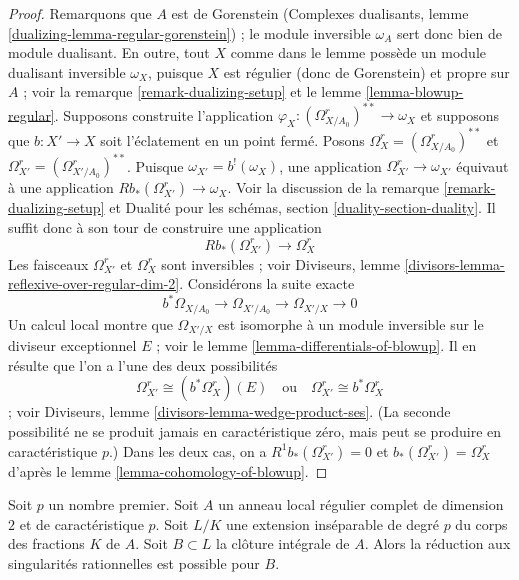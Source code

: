 \begin{proof} Remarquons que $A$ est de Gorenstein (Complexes dualisants, lemme \ref{dualizing-lemma-regular-gorenstein}) ; le module inversible $\omega_A$ sert donc bien de module dualisant. En outre, tout $X$ comme dans le lemme possède un module dualisant inversible $\omega_X$, puisque $X$ est régulier (donc de Gorenstein) et propre sur $A$ ; voir la remarque \ref{remark-dualizing-setup} et le lemme \ref{lemma-blowup-regular}. Supposons construite l'application $\varphi_X : (\Omega^r_{X/A_0})^{**} \to \omega_X$ et supposons que $b : X' \to X$ soit l'éclatement en un point fermé. Posons $\Omega^r_X = (\Omega^r_{X/A_0})^{**}$ et $\Omega^r_{X'} = (\Omega^r_{X'/A_0})^{**}$. Puisque $\omega_{X'} = b^!(\omega_X)$, une application $\Omega^r_{X'} \to \omega_{X'}$ équivaut à une application $Rb_*(\Omega^r_{X'}) \to \omega_X$. Voir la discussion de la remarque \ref{remark-dualizing-setup} et Dualité pour les schémas, section \ref{duality-section-duality}. Il suffit donc à son tour de construire une application $$
Rb_*(\Omega^r_{X'}) \longrightarrow \Omega^r_X
$$ Les faisceaux $\Omega^r_{X'}$ et $\Omega^r_X$ sont inversibles ; voir Diviseurs, lemme \ref{divisors-lemma-reflexive-over-regular-dim-2}. Considérons la suite exacte $$
b^*\Omega_{X/A_0} \to \Omega_{X'/A_0} \to \Omega_{X'/X} \to 0
$$ Un calcul local montre que $\Omega_{X'/X}$ est isomorphe à un module inversible sur le diviseur exceptionnel $E$ ; voir le lemme \ref{lemma-differentials-of-blowup}. Il en résulte que l'on a l'une des deux possibilités $$
\Omega^r_{X'} \cong (b^*\Omega^r_X)(E)
\quad\text{ou}\quad
\Omega^r_{X'} \cong b^*\Omega^r_X
$$ ; voir Diviseurs, lemme \ref{divisors-lemma-wedge-product-ses}. (La seconde possibilité ne se produit jamais en caractéristique zéro, mais peut se produire en caractéristique $p$.) Dans les deux cas, on a $R^1b_*(\Omega^r_{X'}) = 0$ et $b_*(\Omega^r_{X'}) = \Omega^r_X$ d'après le lemme \ref{lemma-cohomology-of-blowup}. \end{proof}

\begin{lemma} \label{lemma-go-up-degree-p} Soit $p$ un nombre premier. Soit $A$ un anneau local régulier complet de dimension $2$ et de caractéristique $p$. Soit $L/K$ une extension inséparable de degré $p$ du corps des fractions $K$ de $A$. Soit $B \subset L$ la clôture intégrale de $A$. Alors la réduction aux singularités rationnelles est possible pour $B$. \end{lemma}

